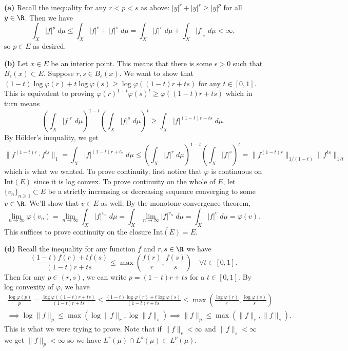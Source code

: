 \documentclass[11pt,letterpaper]{article}
\begin{document}
\begin{solution}
    \textbf{(a)} Recall the inequality for any $r<p<s$ as above: $|y|^r+|y|^s\geq |y|^p$ for all $y\in \R$. Then we have
    \[
        \int_X |f|^p\;d\mu \leq \int_X |f|^r + |f|^s\;d\mu = \int_X |f|^r\;d\mu + \int_X |f|_s\;d\mu < \infty,
    \]
    so $p\in E$ as desired.

    \textbf{(b)} Let $x\in E$ be an interior point. This means that there is some $\epsilon>0$ such that $B_\epsilon(x)\subset E$. Suppose $r,s\in B_\epsilon(x)$. We want to show that $(1-t)\log \varphi(r)+t\log\varphi(s) \geq \log\varphi((1-t)r+ts)$ for any $t\in [0,1]$. This is equivalent to proving $\varphi(r)^{1-t}\varphi(s)^t \geq \varphi((1-t)r+ts)$ which in turn means
    \[
        \left(\int_X |f|^r\;d\mu\right)^{1-t}\left(\int_X |f|^s\;d\mu\right)^t\geq \int_X |f|^{(1-t)r+ts}\;d\mu
    .\]  
    By H\"older's inequality, we get 
    \[
        \|f^{(1-t)r}\cdot f^{ts}\|_1 = \int_X |f|^{(1-t)r+ts}\;d\mu \leq \left(\int_X |f|^r\;d\mu\right)^{1-t}\left(\int_X |f|^s\right)^t=\|f^{(1-t)r}\|_{1 /(1-t)}\|f^{ts}\|_{1 /t}
    \]
    which is what we wanted. To prove continuity, first notice that $\varphi$ is continuous on $\text{Int}(E)$ since it is log convex. To prove continuity on the whole of $E$, let $\{v_n\}_{n\geq 1}\subset E$ be a strictly increasing or decreasing sequence converging to some $v\in \R$. We'll show that $v\in E$ as well. By the monotone convergence theorem,
    \[
        \lim_{n\to \infty}\varphi(v_n)=\lim_{n\to \infty}\int_X |f|^{v_n}\;d\mu = \int_X \lim_{n\to \infty} |f|^{v_n}\;d\mu = \int_X |f|^v\;d\mu = \varphi(v)
    .\] 
    This suffices to prove continuity on the closure $\overline{\text{Int}(E)}=E$. 

    \textbf{(d)} Recall the inequality for any function $f$ and $r,s\in \R$ we have
    \[
        \frac{(1-t)f(r)+tf(s)}{(1-t)r+ts}\leq \max\left(\frac{f(r)}{r}, \frac{f(s)}{s}\right)\quad \forall t\in[0,1]
    .\]  
    Then for any $p \in (r,s)$, we can write $p=(1-t)r+ts$ for a $t\in [0,1]$. By log convexity of $\varphi$, we have
    \[
        \begin{aligned}
            \frac{\log\varphi(p)}{p}=\frac{\log\varphi((1-t)r+ts)}{(1-t)r+ts}\leq \frac{(1-t)\log\varphi(r)+t\log\varphi(s)}{(1-t)r+ts}\leq \max\left(\frac{\log\varphi(r)}{r}, \frac{\log\varphi(s)}{s}\right) \\
            \implies \log \|f\|_p \leq \max(\log\|f\|_r, \log\|f\|_s) \implies \|f\|_p \leq \max(\|f\|_r,\|f\|_s).
        \end{aligned}
    \]
    This is what we were trying to prove. Note that if $\|f\|_r< \infty$ and $\|f\|_s<\infty$ we get $\|f\|_p<\infty$ so we have $L^r(\mu)\cap L^s(\mu)\subset L^p(\mu)$. 


\end{solution}
\end{document}
